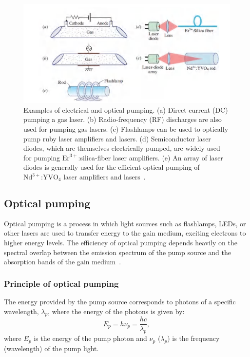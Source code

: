 \documentclass[prl,twocolumn]{revtex4-1}
\begin{document}
\begin{figure}[!b]
    \centering
    \includegraphics[width=\linewidth]{Images/pumping_techniques.png}
    \caption{Examples of electrical and optical pumping. \newline
    (a) Direct current (DC) pumping a gas laser. (b) Radio-frequency (RF) discharges are also used for pumping gas lasers. (c) Flashlamps can be used to optically pump ruby laser amplifiers and lasers. (d) Semiconductor laser diodes, which are themselves electrically pumped, are widely used for pumping $\text{Er}^{3+}$:silica-fiber laser amplifiers. (e) An array of laser diodes is generally used for the efficient optical pumping of $\text{Nd}^{3+}\text{:YVO}_4$ laser amplifiers and lasers~\cite{Saleh2007}.}
    \label{fig:pumping_techniques}
\end{figure}

\subsection{Optical pumping}
Optical pumping is a process in which light sources such as flashlamps, LEDs, or other lasers are used to transfer energy to the gain medium, exciting electrons to higher energy levels. The efficiency of optical pumping depends heavily on the spectral overlap between the emission spectrum of the pump source and the absorption bands of the gain medium~\cite{optical_pumping}.

\subsubsection{\textbf{Principle of optical pumping}}
The energy provided by the pump source corresponds to photons of a specific wavelength, $\lambda_p$, where the energy of the photons is given by:
%
\begin{equation}
    E_p = h \nu_p = \frac{hc}{\lambda_p},
\end{equation}
%
where $E_p$ is the energy of the pump photon and $\nu_p$ ($\lambda_p$) is the frequency (wavelength) of the pump light.
\end{document}

